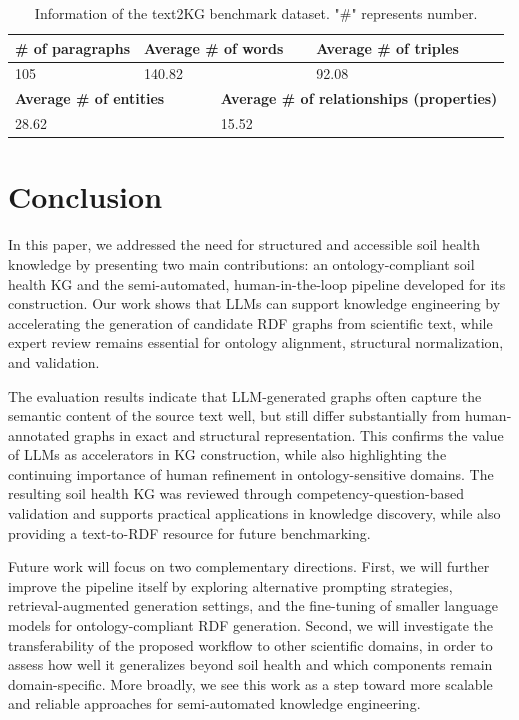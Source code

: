 \documentclass[preprint,12pt]{elsarticle}
\begin{document}
\begin{table}[ht]
\centering
\caption{Information of the text2KG benchmark dataset. "\#" represents number.} \label{tab5}
\begin{tabular}{|llllll|}
\hline
\multicolumn{2}{|l|}{\textbf{\# of paragraphs}} & \multicolumn{2}{l|}{\textbf{Average \# of words}} & \multicolumn{2}{l|}{\textbf{Average \# of triples}} \\ \hline
\multicolumn{2}{|l|}{105} & \multicolumn{2}{l|}{140.82} & \multicolumn{2}{l|}{92.08} \\ \hline
\multicolumn{3}{|l|}{\textbf{Average \# of entities}}                     & \multicolumn{3}{l|}{\textbf{Average \# of relationships (properties)}}        \\ \hline
\multicolumn{3}{|l|}{28.62}                & \multicolumn{3}{l|}{15.52}             \\ \hline
\end{tabular}
\end{table}


\section{Conclusion}\label{sec7}
In this paper, we addressed the need for structured and accessible soil health knowledge by presenting two main contributions: an ontology-compliant soil health KG and the semi-automated, human-in-the-loop pipeline developed for its construction. Our work shows that LLMs can support knowledge engineering by accelerating the generation of candidate RDF graphs from scientific text, while expert review remains essential for ontology alignment, structural normalization, and validation.

The evaluation results indicate that LLM-generated graphs often capture the semantic content of the source text well, but still differ substantially from human-annotated graphs in exact and structural representation. This confirms the value of LLMs as accelerators in KG construction, while also highlighting the continuing importance of human refinement in ontology-sensitive domains. The resulting soil health KG was reviewed through competency-question-based validation and supports practical applications in knowledge discovery, while also providing a text-to-RDF resource for future benchmarking.

Future work will focus on two complementary directions. First, we will further improve the pipeline itself by exploring alternative prompting strategies, retrieval-augmented generation settings, and the fine-tuning of smaller language models for ontology-compliant RDF generation. Second, we will investigate the transferability of the proposed workflow to other scientific domains, in order to assess how well it generalizes beyond soil health and which components remain domain-specific. More broadly, we see this work as a step toward more scalable and reliable approaches for semi-automated knowledge engineering.
\end{document}

